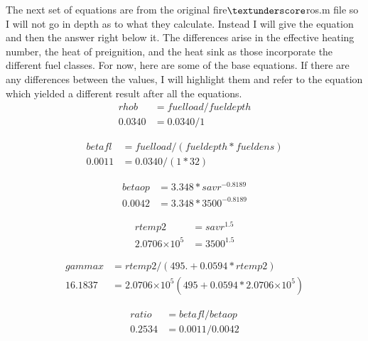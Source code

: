 \documentclass{article}
\newcommand\tenpow[1]{\ensuremath{{\times}10^{#1}}}
\newcommand\und{\textunderscore}
\begin{document}
The next set of equations are from the original fire$\und$ros.m file so I will not go in depth as to what they calculate. Instead I will give the equation and then the answer right below it. The differences arise in the effective heating number, the heat of preignition, and the heat sink as those incorporate the different fuel classes. For now, here are some of the base equations. If there are any differences between the values, I will highlight them and refer to the equation which yielded a different result after all the equations. 
\begin{equation}
\label{rhob_WFA}
	\begin{split}
		rhob  &= fuelload/fueldepth \\
		0.0340 &= 0.0340 / 1
	\end{split}
\end{equation}


\begin{equation}
	\label{betafl_WFA}
	\begin{split}
		betafl        &= fuelload/(fueldepth * fueldens) \\
		0.0011 &= 0.0340 / (1 * 32)
	\end{split}
\end{equation}



\begin{equation}
\label{betaop_WFA}
	\begin{split}
		betaop        &= 3.348 * savr^{ -0.8189} \\
		0.0042 &= 3.348 * 3500 ^ { -0.8189}
	\end{split}
\end{equation}


\begin{equation}
	\label{rtemp2_WFA}
	\begin{split}
		rtemp2        &= savr^ {1.5} \\
		2.0706\tenpow{5} &= 3500 ^ {1.5}
	\end{split}
\end{equation}


\begin{equation}
	\label{gammax_WFA}
	\begin{split}
		gammax        &= rtemp2/(495. + 0.0594*rtemp2) \\
		16.1837 &= 2.0706\tenpow{5} (495 + 0.0594* 2.0706\tenpow{5})
	\end{split}
\end{equation}

\begin{equation}
	\label{ratio_WFA}
	\begin{split}
		ratio &= betafl/betaop \\ 
		0.2534 &=0.0011 / 0.0042
	\end{split}
\end{equation}
\end{document}
